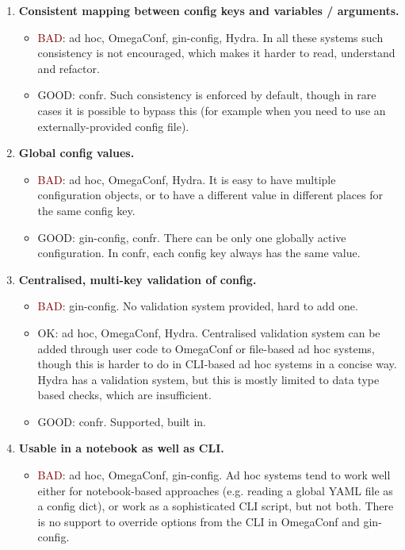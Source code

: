 \documentclass{itatnew}
\begin{document}
\begin{enumerate}
\begin{itemize}
        \end{itemize}
    \item \textbf{Consistent mapping between config keys and variables / arguments.}
        \begin{itemize}
            \item \textcolor{Maroon}{BAD}: ad hoc, OmegaConf, gin-config, Hydra. In all these systems such consistency is not encouraged, which makes it harder to read, understand and refactor.
            \item \textcolor{OliveGreen}{GOOD}: confr. Such consistency is enforced by default, though in rare cases it is possible to bypass this (for example when you need to use an externally-provided config file).
        \end{itemize}
    \item \textbf{Global config values.}
        \begin{itemize}
            \item \textcolor{Maroon}{BAD}: ad hoc, OmegaConf, Hydra. It is easy to have multiple configuration objects, or to have a different value in different places for the same config key.
            \item \textcolor{OliveGreen}{GOOD}: gin-config, confr. There can be only one globally active configuration. In confr, each config key always has the same value.
        \end{itemize}
    \item \textbf{Centralised, multi-key validation of config.}
        \begin{itemize}
            \item \textcolor{Maroon}{BAD}: gin-config. No validation system provided, hard to add one.
            \item \textcolor{YellowOrange}{OK}: ad hoc, OmegaConf, Hydra. Centralised validation system can be added through user code to OmegaConf or file-based ad hoc systems, though this is harder to do in CLI-based ad hoc systems in a concise way. Hydra has a validation system, but this is mostly limited to data type based checks, which are insufficient.
            \item \textcolor{OliveGreen}{GOOD}: confr. Supported, built in.
        \end{itemize}
    \item \textbf{Usable in a notebook as well as CLI.}
        \begin{itemize}
            \item \textcolor{Maroon}{BAD}: ad hoc, OmegaConf, gin-config. Ad hoc systems tend to work well either for notebook-based approaches (e.g. reading a global YAML file as a config dict), or work as a sophisticated CLI script, but not both. There is no support to override options from the CLI in OmegaConf and gin-config.

\end{itemize}
\end{enumerate}
\end{document}
